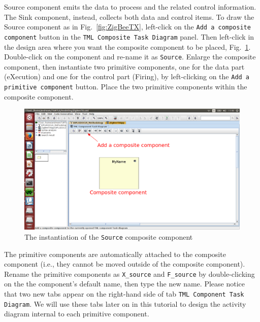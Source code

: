 \documentclass{llncs}
\newcommand{\screenshotsize}{1.0\textwidth}
\begin{document}
Source component emits the data to process and the related control information. The Sink component, instead, collects
both data and control items. To draw the Source component as in Fig.~\ref{fig:ZigBeeTX}, left-click on the \texttt{Add
a composite component} button in the \texttt{TML Composite Task Diagram} panel. Then left-click in the design area where
you want the composite component to be placed, Fig.~\ref{fig:Src1}. Double-click on the component and re-name it as
\texttt{Source}. Enlarge the composite component, then instantiate two primitive components, one for the data part
(eXecution) and one for the control part (Firing), by left-clicking on the \texttt{Add a primitive component} button.
Place the two primitive components within the composite component.
%
\begin{figure}[!htbp]
	\centering
	\includegraphics[width=\screenshotsize]{figures/screenshot/Src1.png}
	\caption{The instantiation of the \texttt{Source} composite component}
	\label{fig:Src1}
\end{figure}
%
%
The primitive components are automatically attached to the composite component (i.e., they cannot be moved outside of
the composite component). Rename the primitive components as \texttt{X\_source} and \texttt{F\_source} by
double-clicking on the the component's default name, then type the new name. Please notice that two new tabs appear on
the right-hand side of tab \texttt{TML Component Task Diagram}. We will use these tabs later on in this tutorial to
design the activity diagram internal to each primitive component.\\
%
\end{document}
